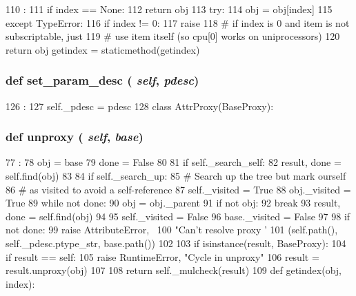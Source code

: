 \begin{DoxyCode}
110                             :
111         if index == None:
112             return obj
113         try:
114             obj = obj[index]
115         except TypeError:
116             if index != 0:
117                 raise
118             # if index is 0 and item is not subscriptable, just
119             # use item itself (so cpu[0] works on uniprocessors)
120         return obj
    getindex = staticmethod(getindex)
\end{DoxyCode}
\hypertarget{classm5_1_1proxy_1_1BaseProxy_aa1d1be95abe1fe821c85b7d03dd57f12}{
\subsubsection[{set\_\-param\_\-desc}]{\setlength{\rightskip}{0pt plus 5cm}def set\_\-param\_\-desc ( {\em self}, \/   {\em pdesc})}}
\label{classm5_1_1proxy_1_1BaseProxy_aa1d1be95abe1fe821c85b7d03dd57f12}



\begin{DoxyCode}
126                                    :
127         self._pdesc = pdesc
128 
class AttrProxy(BaseProxy):
\end{DoxyCode}
\hypertarget{classm5_1_1proxy_1_1BaseProxy_a587cd3c1e899640dc09d63793aa8093b}{
\subsubsection[{unproxy}]{\setlength{\rightskip}{0pt plus 5cm}def unproxy ( {\em self}, \/   {\em base})}}
\label{classm5_1_1proxy_1_1BaseProxy_a587cd3c1e899640dc09d63793aa8093b}



\begin{DoxyCode}
77                            :
78         obj = base
79         done = False
80 
81         if self._search_self:
82             result, done = self.find(obj)
83 
84         if self._search_up:
85             # Search up the tree but mark ourself
86             # as visited to avoid a self-reference
87             self._visited = True
88             obj._visited = True
89             while not done:
90                 obj = obj._parent
91                 if not obj:
92                     break
93                 result, done = self.find(obj)
94 
95             self._visited = False
96             base._visited = False
97 
98         if not done:
99             raise AttributeError, \
100                   "Can't resolve proxy '%
101                   (self.path(), self._pdesc.ptype_str, base.path())
102 
103         if isinstance(result, BaseProxy):
104             if result == self:
105                 raise RuntimeError, "Cycle in unproxy"
106             result = result.unproxy(obj)
107 
108         return self._mulcheck(result)
109 
    def getindex(obj, index):
\end{DoxyCode}



